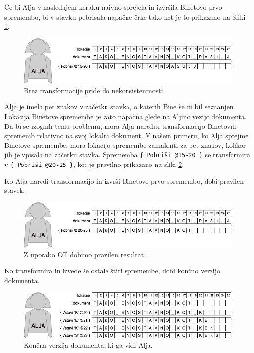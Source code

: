 \documentclass[a4paper, 12pt, twoside]{book}
\begin{document}
Če bi Alja v naslednjem koraku naivno sprejela in izvršila Binetovo prvo spremembo, bi v stavku pobrisala napačne črke tako kot je to prikazano na Sliki \ref{ot3}.

\begin{figure}[placement h]
\begin{center}
\includegraphics[width=12cm]{ot3.png}
\end{center}
\caption{Brez transformacije pride do nekonsistentnosti.}
\label{ot3}
\end{figure}

Alja je imela pet znakov v začetku stavka, o katerih Bine še ni bil seznanjen. Lokacija Binetove spremembe je zato napačna glede na Aljino vezijo dokumenta. Da bi se izognili temu problemu, mora Alja narediti transformacijo Binetovih sprememb relativno na svoj lokalni dokument. V našem primeru, ko Alja sprejme Binetove spremembe, mora lokacijo spremembe zamakniti za pet znakov, kolikor jih je vpisala na začetku stavka. Sprememba {\tt \{ Pobriši @15-20 \}} se transformira v {\tt \{ Pobriši @20-25 \}}, kot je pravilno prikazano na sliki \ref{ot4}.

\pagebreak

Ko Alja naredi transformacijo in izvrši Binetovo prvo spremembo, dobi pravilen stavek.

\begin{figure}[placement h]
\begin{center}
\includegraphics[width=12cm]{ot4.png}
\end{center}
\caption{Z uporabo OT dobimo pravilen rezultat.}
\label{ot4}
\end{figure}

Ko transformira in izvede še ostale štiri spremembe, dobi končno verzijo dokumenta.

\begin{figure}[placement h]
\begin{center}
\includegraphics[width=12cm]{ot5.png}
\end{center}
\caption{Končna verzija dokumenta, ki ga vidi Alja.}
\label{ot5}
\end{figure}
\end{document}
